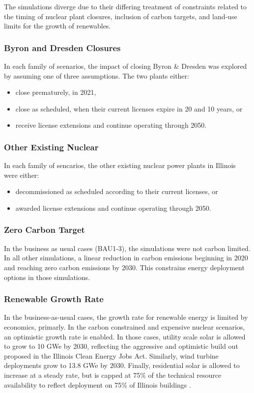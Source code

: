 The simulations diverge due to their differing treatment of constraints related 
to the timing of nuclear plant closures, inclusion of 
carbon targets, and land-use limits for the growth of renewables.

\subsubsection{Byron and Dresden Closures}
In each family of scenarios, the impact of closing Byron \& Dresden was explored 
by assuming one of three assumptions. The two plants either:
\begin{itemize} 
        \item close prematurely, in 2021,
        \item close as scheduled, when their current licenses expire in 20 and 10 
        years, or
        \item receive license extensions and continue operating through 2050.
\end{itemize}


\subsubsection{Other Existing Nuclear}
In each family of sencarios, the other existing nuclear power plants in 
Illinois were  either:
\begin{itemize}
        \item decommissioned as scheduled according to their current 
licenses, or 
        \item awarded license extensions and continue operating through 2050.
\end{itemize}

\subsubsection{Zero Carbon Target}
In the business as usual cases (BAU1-3), the simulations were not carbon limited. In all 
other simulations, a linear reduction in carbon emissions beginning in 2020 and 
reaching zero carbon emissions by 2030. This constrains energy 
deployment options in those simulations.

\subsubsection{Renewable Growth Rate}
In the business-as-usual cases, the growth rate for renewable energy is limited by economics, 
primarly. In the carbon constrained and expensive nuclear scenarios, an 
optimistic growth rate is enabled.
In those cases, utility scale solar is allowed to grow to 10 GWe by 2030, 
reflecting the aggressive and optimistic build out proposed in the Illinois 
Clean Energy Jobs Act. Similarly, wind turbine deployments grow to 13.8 GWe 
by 2030. Finally, residential solar is allowed to 
increase at a steady rate, but is capped at 75\% of the technical resource 
availability to reflect deployment on 75\% of Illinois buildings 
\cite{gagnon_rooftop_2016}. 

